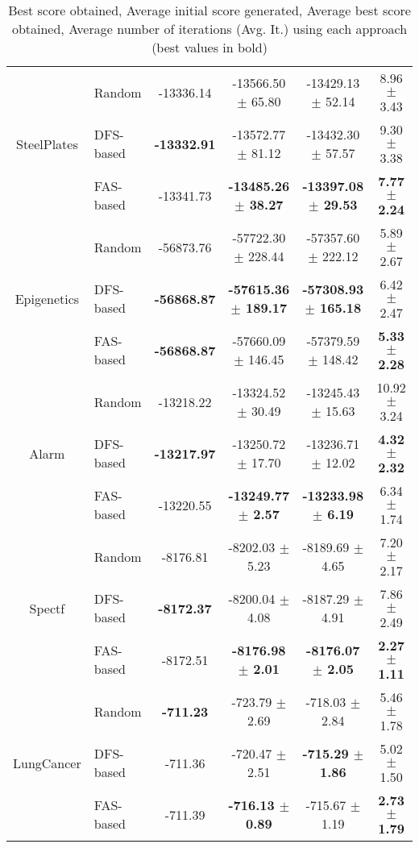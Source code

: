 \begin{table}[ h ]
\begin{tabular}{| c | l | c | c | c | c | }
		\multirow{3}{*}{SteelPlates} & Random & -13336.14 & -13566.50 $\pm$ 65.80 & -13429.13 $\pm$ 52.14 & 8.96 $\pm$ 3.43 \\ \cline{2-6} 
				& DFS-based & \textbf{-13332.91} & -13572.77 $\pm$ 81.12 & -13432.30 $\pm$ 57.57 & 9.30 $\pm$ 3.38 \\ \cline{2-6}
				& FAS-based & -13341.73 & \textbf{-13485.26 $\pm$ 38.27} & \textbf{-13397.08 $\pm$ 29.53} & \textbf{7.77 $\pm$ 2.24} \\ \hline \hline

		\multirow{3}{*}{Epigenetics} & Random & -56873.76 & -57722.30 $\pm$ 228.44 & -57357.60 $\pm$ 222.12 & 5.89 $\pm$ 2.67 \\ \cline{2-6} 
				& DFS-based & \textbf{-56868.87} & \textbf{-57615.36 $\pm$ 189.17} & \textbf{-57308.93 $\pm$ 165.18} & 6.42 $\pm$ 2.47 \\ \cline{2-6}
				& FAS-based & \textbf{-56868.87} & -57660.09 $\pm$ 146.45 & -57379.59 $\pm$ 148.42 & \textbf{5.33 $\pm$ 2.28} \\ \hline \hline

		\multirow{3}{*}{Alarm} & Random & -13218.22 & -13324.52 $\pm$ 30.49 & -13245.43 $\pm$ 15.63 & 10.92 $\pm$ 3.24 \\ \cline{2-6} 
				& DFS-based & \textbf{-13217.97} & -13250.72 $\pm$ 17.70 & -13236.71 $\pm$ 12.02 & \textbf{4.32 $\pm$ 2.32} \\ \cline{2-6}
				& FAS-based & -13220.55 & \textbf{-13249.77 $\pm$ 2.57} & \textbf{-13233.98 $\pm$ 6.19} & 6.34 $\pm$ 1.74 \\ \hline \hline

		\multirow{3}{*}{Spectf} & Random & -8176.81 & -8202.03 $\pm$ 5.23 & -8189.69 $\pm$ 4.65 & 7.20 $\pm$ 2.17 \\ \cline{2-6} 
				& DFS-based & \textbf{-8172.37} & -8200.04 $\pm$ 4.08 & -8187.29 $\pm$ 4.91 & 7.86 $\pm$ 2.49 \\ \cline{2-6}
				& FAS-based & -8172.51 & \textbf{-8176.98 $\pm$ 2.01} & \textbf{-8176.07 $\pm$ 2.05} & \textbf{2.27 $\pm$ 1.11} \\ \hline \hline 
					
		\multirow{3}{*}{LungCancer} & Random & \textbf{-711.23} & -723.79 $\pm$ 2.69 & -718.03 $\pm$ 2.84 & 5.46 $\pm$ 1.78 \\ \cline{2-6} 
				& DFS-based & -711.36 & -720.47 $\pm$ 2.51 & \textbf{-715.29 $\pm$ 1.86} & 5.02 $\pm$ 1.50 \\ \cline{2-6}
				& FAS-based & -711.39 & \textbf{-716.13 $\pm$ 0.89} & -715.67 $\pm$ 1.19 & \textbf{2.73 $\pm$ 1.79} \\ \hline
	\end{tabular}
	\caption{Best score obtained, Average initial score generated, Average best score obtained, Average number of iterations (Avg. It.) using each approach (best values in bold)}
	\label{tab:comparison}
\end{table}
